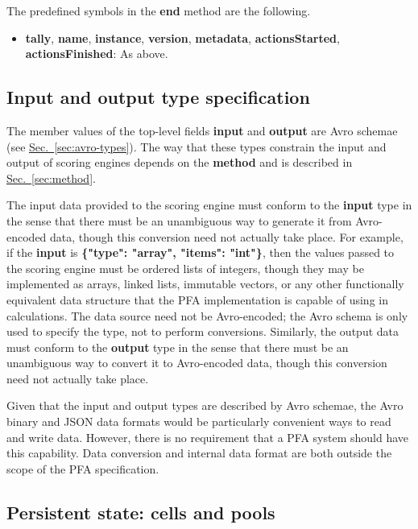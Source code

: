 \documentclass{article}
\newcommand{\PFAc}{\ttfamily\bfseries}
\theoremstyle{definition}
\begin{document}
\noindent The predefined symbols in the {\PFAc end} method are the following.
\begin{itemize}
\item {\PFAc tally}, {\PFAc name}, {\PFAc instance}, {\PFAc version}, {\PFAc metadata}, {\PFAc actionsStarted}, {\PFAc actionsFinished}: As above.
\end{itemize}

\hypertarget{hsec:input-output}{}
\subsection{Input and output type specification}
\label{sec:input-output}

The member values of the top-level fields {\PFAc input} and {\PFAc output} are Avro schemae (see \hyperlink{hsec:avro-types}{Sec.~\ref{sec:avro-types}}).  The way that these types constrain the input and output of scoring engines depends on the {\PFAc method} and is described in \hyperlink{hsec:method}{Sec.~\ref{sec:method}}.

The input data provided to the scoring engine must conform to the {\PFAc input} type in the sense that there must be an unambiguous way to generate it from Avro-encoded data, though this conversion need not actually take place.  For example, if the {\PFAc input} is {\PFAc \{"type":$\!$ "array", "items":$\!$ "int"\}}, then the values passed to the scoring engine must be ordered lists of integers, though they may be implemented as arrays, linked lists, immutable vectors, or any other functionally equivalent data structure that the PFA implementation is capable of using in calculations.  The data source need not be Avro-encoded; the Avro schema is only used to specify the type, not to perform conversions.  Similarly, the output data must conform to the {\PFAc output} type in the sense that there must be an unambiguous way to convert it to Avro-encoded data, though this conversion need not actually take place.

Given that the input and output types are described by Avro schemae, the Avro binary and JSON data formats would be particularly convenient ways to read and write data.  However, there is no requirement that a PFA system should have this capability.  Data conversion and internal data format are both outside the scope of the PFA specification.

\hypertarget{hsec:state}{}
\subsection{Persistent state: cells and pools}
\label{sec:state}
\end{document}
